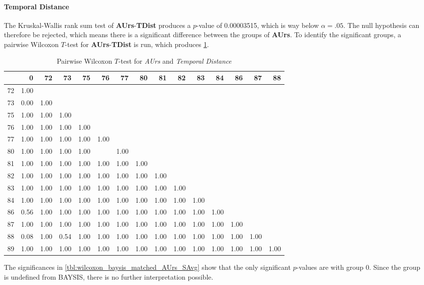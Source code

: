 \paragraph{Temporal Distance}
The Kruskal-Wallis rank sum test of \textbf{AUrs}-\textbf{TDist} produces a $p$-value of 0.00003515, which is way below $\alpha=.05$. The null hypothesis can therefore be rejected, which means there is a significant difference between the groups of \textbf{AUrs}. To identify the significant groups, a pairwise Wilcoxon $T$-test for \textbf{AUrs}-\textbf{TDist} is run, which produces \cref{tbl:wilcoxon_baysis_matched_AUrs_TDist}.
\begin{table}[ht]
	\tiny
	\centering
	\begin{tabular}{rrrrrrrrrrrrrrr}
        \toprule
        & 0 & 72 & 73 & 75 & 76 & 77 & 80 & 81 & 82 & 83 & 84 & 86 & 87 & 88 \\ 
        \midrule
        72 & 1.00 &  &  &  &  &  &  &  &  &  &  &  &  &  \\ 
        73 & 0.00 & 1.00 &  &  &  &  &  &  &  &  &  &  &  &  \\ 
        75 & 1.00 & 1.00 & 1.00 &  &  &  &  &  &  &  &  &  &  &  \\ 
        76 & 1.00 & 1.00 & 1.00 & 1.00 &  &  &  &  &  &  &  &  &  &  \\ 
        77 & 1.00 & 1.00 & 1.00 & 1.00 & 1.00 &  &  &  &  &  &  &  &  &  \\ 
        80 & 1.00 & 1.00 & 1.00 & 1.00 &  & 1.00 &  &  &  &  &  &  &  &  \\ 
        81 & 1.00 & 1.00 & 1.00 & 1.00 & 1.00 & 1.00 & 1.00 &  &  &  &  &  &  &  \\ 
        82 & 1.00 & 1.00 & 1.00 & 1.00 & 1.00 & 1.00 & 1.00 & 1.00 &  &  &  &  &  &  \\ 
        83 & 1.00 & 1.00 & 1.00 & 1.00 & 1.00 & 1.00 & 1.00 & 1.00 & 1.00 &  &  &  &  &  \\ 
        84 & 1.00 & 1.00 & 1.00 & 1.00 & 1.00 & 1.00 & 1.00 & 1.00 & 1.00 & 1.00 &  &  &  &  \\ 
        86 & 0.56 & 1.00 & 1.00 & 1.00 & 1.00 & 1.00 & 1.00 & 1.00 & 1.00 & 1.00 & 1.00 &  &  &  \\ 
        87 & 1.00 & 1.00 & 1.00 & 1.00 & 1.00 & 1.00 & 1.00 & 1.00 & 1.00 & 1.00 & 1.00 & 1.00 &  &  \\ 
        88 & 0.08 & 1.00 & 0.54 & 1.00 & 1.00 & 1.00 & 1.00 & 1.00 & 1.00 & 1.00 & 1.00 & 1.00 & 1.00 &  \\ 
        89 & 1.00 & 1.00 & 1.00 & 1.00 & 1.00 & 1.00 & 1.00 & 1.00 & 1.00 & 1.00 & 1.00 & 1.00 & 1.00 & 1.00 \\ 
        \bottomrule
	  \end{tabular}
	\caption{Pairwise Wilcoxon $T$-test for \textit{AUrs} and \textit{Temporal Distance}}
	\label{tbl:wilcoxon_baysis_matched_AUrs_TDist}
\end{table}
The significances in \cref{tbl:wilcoxon_baysis_matched_AUrs_SAvg} show that the only significant $p$-values are with group 0. Since the group is undefined from BAYSIS, there is no further interpretation possible.


